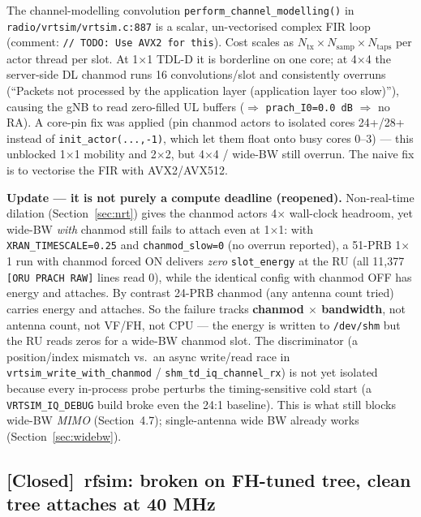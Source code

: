\documentclass[11pt,a4paper]{article}
\newcommand{\closed}{\textcolor{closedcol}{\textbf{[Closed]}}}
\begin{document}
The channel-modelling convolution \texttt{perform\_channel\_modelling()} in
\texttt{radio/vrtsim/vrtsim.c:887} is a scalar, un-vectorised complex FIR loop (comment:
\texttt{// TODO: Use AVX2 for this}). Cost scales as $N_\text{tx} \times N_\text{samp} \times
N_\text{taps}$ per actor thread per slot. At 1$\times$1 TDL-D it is borderline on one core;
at 4$\times$4 the server-side DL chanmod runs 16 convolutions/slot and consistently overruns
(``Packets not processed by the application layer (application layer too slow)''), causing the
gNB to read zero-filled UL buffers ($\Rightarrow$ \texttt{prach\_I0=0.0~dB} $\Rightarrow$ no
RA). A core-pin fix was applied (pin chanmod actors to isolated cores 24+/28+ instead of
\texttt{init\_actor(...,-1)}, which let them float onto busy cores 0--3) --- this unblocked
1$\times$1 mobility and 2$\times$2, but 4$\times$4 / wide-BW still overrun. The naive fix
is to vectorise the FIR with AVX2/AVX512.

\textbf{Update --- it is not purely a compute deadline (reopened).} Non-real-time dilation
(Section~\ref{sec:nrt}) gives the chanmod actors 4$\times$ wall-clock headroom, yet wide-BW
\emph{with} chanmod still fails to attach even at 1$\times$1: with \texttt{XRAN\_TIMESCALE=0.25}
and \texttt{chanmod\_slow=0} (no overrun reported), a 51-PRB 1$\times$1 run with chanmod forced
ON delivers \emph{zero} \texttt{slot\_energy} at the RU (all 11{,}377 \texttt{[ORU PRACH RAW]}
lines read 0), while the identical config with chanmod OFF has energy and attaches. By
contrast 24-PRB chanmod (any antenna count tried) carries energy and attaches. So the failure
tracks \textbf{chanmod $\times$ bandwidth}, not antenna count, not VF/FH, not CPU --- the
energy is written to \texttt{/dev/shm} but the RU reads zeros for a wide-BW chanmod slot. The
discriminator (a position/index mismatch vs.\ an async write/read race in
\texttt{vrtsim\_write\_with\_chanmod} / \texttt{shm\_td\_iq\_channel\_rx}) is not yet isolated
because every in-process probe perturbs the timing-sensitive cold start (a \texttt{VRTSIM\_IQ\_DEBUG}
build broke even the 24:1 baseline). This is what still blocks wide-BW \emph{MIMO}
(Section~4.7); single-antenna wide BW already works (Section~\ref{sec:widebw}).

\subsection{\texorpdfstring{\closed}{[Closed]}\ rfsim: broken on FH-tuned tree, clean tree attaches at 40 MHz}
\label{sec:rfsim}
\end{document}
